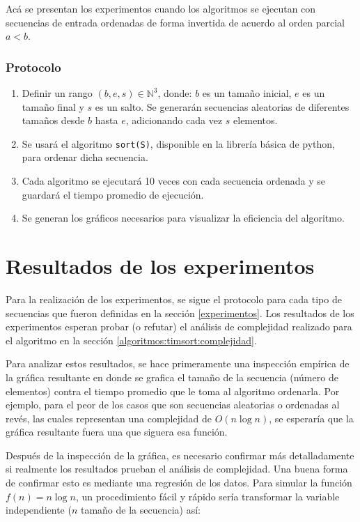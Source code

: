 \documentclass[letter]{article}
\begin{document}
Acá se presentan los experimentos cuando los algoritmos se ejecutan con secuencias de entrada ordenadas de forma invertida de acuerdo al orden parcial $a<b$.

\subsubsection{Protocolo}
\begin{enumerate}
    \item Definir un rango $(b,e,s)\in\mathbb{N}^3$, donde: $b$ es un tamaño inicial, $e$ es un tamaño final y $s$ es un salto. Se generarán secuencias aleatorias de diferentes tamaños desde $b$ hasta $e$, adicionando cada vez $s$ elementos.
    \item Se usará el algoritmo \texttt{sort(S)}, disponible en la librería básica de python, para ordenar dicha secuencia.
    \item Cada algoritmo se ejecutará 10 veces con cada secuencia ordenada y se guardará el tiempo promedio de ejecución.
    \item Se generan los gráficos necesarios para visualizar la eficiencia del algoritmo.
\end{enumerate}

\section{Resultados de los experimentos} \label{resultados}

Para la realización de los experimentos, se sigue el protocolo para cada tipo de secuencias que fueron definidas en la sección \ref{experimentos}. Los resultados de los experimentos esperan probar (o refutar) el análisis de complejidad realizado para el algoritmo en la sección \ref{algoritmos:timsort:complejidad}. \par

Para analizar estos resultados, se hace primeramente una inspección empírica de la gráfica resultante en donde se grafica el tamaño de la secuencia (número de elementos) contra el tiempo promedio que le toma al algoritmo ordenarla. Por ejemplo, para el peor de los casos que son secuencias aleatorias o ordenadas al revés, las cuales representan una complejidad de $O(n \log n)$, se esperaría que la gráfica resultante fuera una que siguera esa función. \par

Después de la inspección de la gráfica, es necesario confirmar más detalladamente si realmente los resultados prueban el análisis de complejidad. Una buena forma de confirmar esto es mediante una regresión de los datos. Para simular la función $f(n) = n \log n$, un procedimiento fácil y rápido sería transformar la variable independiente ($n$ tamaño de la secuencia) así: \par
\end{document}
